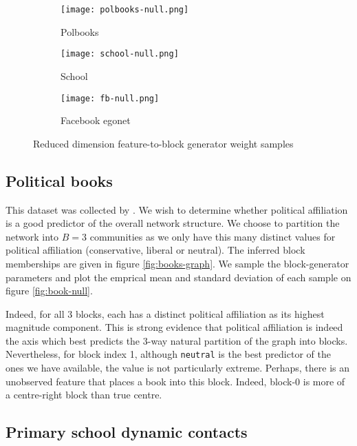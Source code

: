 \begin{figure}[!h]
	\centering
	\begin{subfigure}[t]{0.32\linewidth}
		\centering
		\vskip 0pt
		\texttt{[image: polbooks-null.png]}
		\caption{Polbooks}
		\label{fig:polbooks-null}
	\end{subfigure}
	\hfill
	\begin{subfigure}[t]{0.32\linewidth}
		\centering
		\vskip 0pt
		\texttt{[image: school-null.png]}
		\caption{School}
		\label{fig:school-null}
	\end{subfigure}
	\hfill
	\begin{subfigure}[t]{0.32\linewidth}
		\centering
		\vskip 0pt
		\texttt{[image: fb-null.png]}
		\caption{Facebook egonet}
		\label{fig:fb-null}
	\end{subfigure}
	\caption{Reduced dimension feature-to-block generator weight samples}
\end{figure}

\subsection{Political books}

This dataset was collected by \citet{polbooks}. We wish to determine whether political affiliation is a good predictor of the overall network structure. We choose to partition the network into $B=3$ communities as we only have this many distinct values for political affiliation (conservative, liberal or neutral). The inferred block memberships are given in figure \ref{fig:books-graph}. We sample the block-generator parameters and plot the emprical mean and standard deviation of each sample on figure \ref{fig:book-null}.

Indeed, for all 3 blocks, each has a distinct political affiliation as its highest magnitude component. This is strong evidence that political affiliation is indeed the axis which best predicts the 3-way natural partition of the graph into blocks. Nevertheless, for block index 1, although \verb*|neutral| is the best predictor of the ones we have available, the value is not particularly extreme. Perhaps, there is an unobserved feature that places a book into this block. Indeed, block-0 is more of a centre-right block than true centre.

\FloatBarrier
\subsection{Primary school dynamic contacts}

